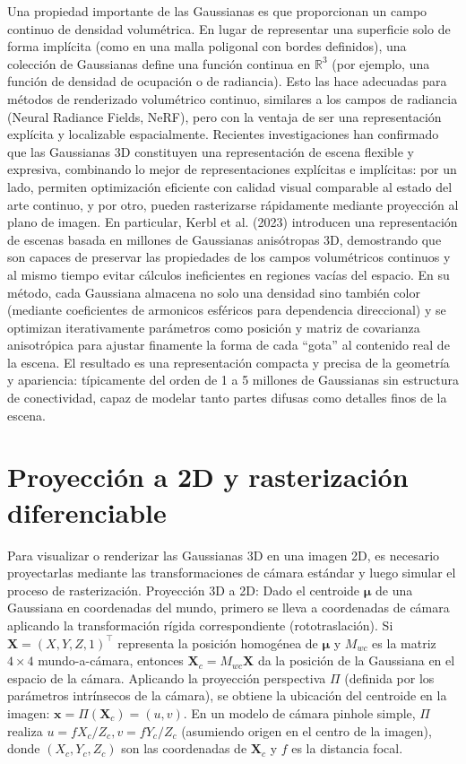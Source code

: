 Una propiedad importante de las Gaussianas es que proporcionan un campo continuo de densidad volumétrica. En lugar de representar una superficie solo 
de forma implícita (como en una malla poligonal con bordes definidos), una colección de Gaussianas define una función continua en $\mathbb{R}^3$ 
(por ejemplo, una función de densidad de ocupación o de radiancia). Esto las hace adecuadas para métodos de renderizado volumétrico continuo, 
similares a los campos de radiancia (Neural Radiance Fields, NeRF), pero con la ventaja de ser una representación explícita y localizable espacialmente. 
Recientes investigaciones han confirmado que las Gaussianas 3D constituyen una representación de escena flexible y expresiva, combinando 
lo mejor de representaciones explícitas e implícitas: por un lado, permiten optimización eficiente con calidad visual comparable al estado del arte continuo, 
y por otro, pueden rasterizarse rápidamente mediante proyección al plano de imagen. En particular, Kerbl et al. (2023) introducen una representación 
de escenas basada en millones de Gaussianas anisótropas 3D, demostrando que son capaces de preservar las propiedades de los campos volumétricos continuos 
y al mismo tiempo evitar cálculos ineficientes en regiones vacías del espacio. En su método, cada Gaussiana almacena no solo una densidad sino también 
color (mediante coeficientes de armonicos esféricos para dependencia direccional) y se optimizan iterativamente parámetros como posición y 
matriz de covarianza anisotrópica para ajustar finamente la forma de cada “gota” al contenido real de la escena. El resultado es una representación 
compacta y precisa de la geometría y apariencia: típicamente del orden de 1 a 5 millones de Gaussianas sin estructura de conectividad, capaz de modelar 
tanto partes difusas como detalles finos de la escena.

\section{Proyección a 2D y rasterización diferenciable}
Para visualizar o renderizar las Gaussianas 3D en una imagen 2D, es necesario proyectarlas mediante las transformaciones de cámara estándar y luego 
simular el proceso de rasterización. Proyección 3D a 2D: Dado el centroide $\boldsymbol{\mu}$ de una Gaussiana en coordenadas del mundo, primero se 
lleva a coordenadas de cámara aplicando la transformación rígida correspondiente (rototraslación). Si $\mathbf{X}=(X,Y,Z,1)^\top$ representa la 
posición homogénea de $\boldsymbol{\mu}$ y $M_{wc}$ es la matriz $4\times4$ mundo-a-cámara, entonces $\mathbf{X}_c = M_{wc}\mathbf{X}$ da la posición 
de la Gaussiana en el espacio de la cámara. Aplicando la proyección perspectiva $\Pi$ (definida por los parámetros intrínsecos de la cámara), 
se obtiene la ubicación del centroide en la imagen: $\mathbf{x} = \Pi(\mathbf{X}_c) = (u,v)$. En un modelo de cámara pinhole simple, $\Pi$ 
realiza $u = f X_c/Z_c, v = f Y_c/Z_c$ (asumiendo origen en el centro de la imagen), donde $(X_c, Y_c, Z_c)$ son las coordenadas de $\mathbf{X}_c$ y $f$ 
es la distancia focal.

